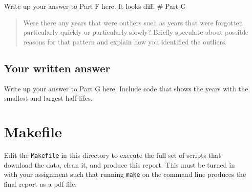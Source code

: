 \documentclass[
]{article}
\begin{document}
Write up your answer to Part F here. It looks diff. \# Part G

\begin{quote}
Were there any years that were outliers such as years that were
forgotten particularly quickly or particularly slowly? Briefly speculate
about possible reasons for that pattern and explain how you identified
the outliers.
\end{quote}

\hypertarget{your-written-answer-5}{%
\subsection{Your written answer}\label{your-written-answer-5}}

Write up your answer to Part G here. Include code that shows the years
with the smallest and largest half-lifes.

\hypertarget{makefile}{%
\section{Makefile}\label{makefile}}

Edit the \texttt{Makefile} in this directory to execute the full set of
scripts that download the data, clean it, and produce this report. This
must be turned in with your assignment such that running \texttt{make}
on the command line produces the final report as a pdf file.
\end{document}
